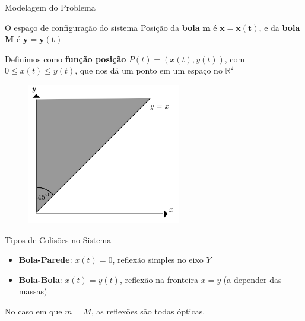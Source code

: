 \documentclass{beamer}
\begin{document}
\begin{frame}[plain]
    \centering
    \vfill
    {\Huge {}Modelagem do Problema}
    \vfill
\end{frame}


\begin{frame}{O espaço de configuração do sistema}
  Posição da \textbf{bola} $\mathbf{m}$ é $\mathbf{x=x(t)}$, e da \textbf{bola} $\mathbf{M}$ é $\mathbf{y=y(t)}$
  
  Definimos como \textbf{função posição} $P(t) = (x(t), y(t))$, com $0 \le x(t) \le y(t)$, que nos dá um ponto em um espaço no $\mathbb{R}^2$

  \begin{figure}
    \centering
    \includegraphics[width=0.6\textwidth]{images/image1-1.png}
  \end{figure}
\end{frame}

\begin{frame}{Tipos de Colisões no Sistema}
  \begin{itemize}
    \item \textbf{Bola-Parede}: $x(t)=0$, reflexão simples no eixo $Y$
    \item \textbf{Bola-Bola}: $x(t)=y(t)$, reflexão na fronteira $x=y$ (a depender das massas)
  \end{itemize}
  No caso em que $m=M$, as reflexões são todas ópticas.
\end{frame}
\end{document}
